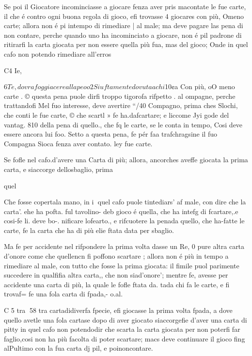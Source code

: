 \documentclass[12pt,a6paper]{article}
\begin{document}
Se poi il Giocatore incominciasse a giocare fenza aver pris
macontate le fue carte, il che
é contro ogni buona regola di
gioco, efi trovasse 4 giocares
con più, Omeno carte; allora
non é pi intempo di rimediare |
al male; ma deve pagare las
pena di non contare, perche
quando uno ha incominciato a
giocare, non é pil padrone di
ritirarfi la carta giocata per
non essere quella più fua, mas
del gioco; Onde in quel cafo
non potendo rimediare all’erros

C4 Ie,

 

 

 

 

 
$6

Te, dovra foggiacere alla peoo

2 Siuftamente dovuta a chi
$10¢a Con più, oO meno carte .
© questa pena puole dirfi
troppo tigorofa rifpetto . al
ompagne, perche trattandofi
Mel fuo interesse, deve avertire
“/40 Compagno, prima ches
Slochi, che conti le fue carte,
© che scartl » fe ha.dafcartare;
e liccome Jyi gode del vantag.
810 della pena di quello., che fq
le carte, se le conta in tempo,
Cosi deve essere ancora lui foo.
Setto a questa pena, fe pér faa
trafchragsine il fuo Compagna
Sioca fenza aver contato. ley
fue carte.

Se fofle nel cafo.d’avere una
Carta di più; allora, ancorches
aveffe giocata la prima carta,
e siaccorge dellosbaglio, prima

quel

Che fosse copertala mano, in i
quel cafo puole tintediars’ af
male, con dire che la carta’.
ehe ha pofta. ful tavolino- deb
gioco é quella, che ha intefg
di fcartare,.e cosi-fe li. deve bo-.
nificare lofearto., e rifcuotere
la penada quello, che ha-fatte
le carte, fe la carta che ha di
più elie ftata data per sbaglio.

Ma fe per accidente nel rifpondere la prima volta dasse un
Re, 0 pure altra carta d’onore
come che quellencn fi poffono scartare ; allora non é più in
tempo a rimediare al male, con
tutto che fosse la prima giocata:
il fimile puol parimente succedere in qualfifia altra carta,,
che non siad’onore’; mentre fe,
avesse per accidente una carta
di più, la quale le fofle ftata da.
tada chi fa le carte, e fi trovaf=
fe una fola carta di fpada,- o.al.

C 5 tra
58
tra cartadidiverfa fpecie, efi
giocasse la prima volta fpada, a
dove quello avetle una fola cartase dopo di aver giocato siaccorgefie d’aver una carta di pitty
in quel cafo non potendodir che
scarta la carta giocata per non
poterfi far faglio,cosi non ha più
facolta di poter scartare; macs
deve continuare il gioco fing
alPultimo con la fua carta dj
pil, e poinoncontare.
\end{document}
